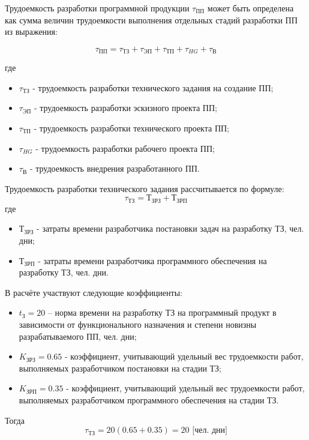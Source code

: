 Трудоемкость разработки программной продукции $\tau_{ПП}$ может быть определена как сумма величин трудоемкости выполнения отдельных стадий разработки ПП из выражения:

\begin{equation}
	\tau_{ПП} = \tau_{ТЗ} + \tau_{ЭП} + \tau_{ТП} + \tau_{HG} + \tau_{В} 
\end{equation}

где 
\begin{itemize}
  \item $\tau_{ТЗ}$ - трудоемкость разработки технического задания на создание ПП;
  \item $\tau_{ЭП}$ - трудоемкость разработки эскизного проекта ПП;
  \item $\tau_{ТП}$ - трудоемкость разработки технического проекта ПП;
  \item $\tau_{HG}$ - трудоемкость разработки рабочего проекта ПП;
  \item $\tau_{В}$ - трудоемкость внедрения разработанного ПП.
\end{itemize}

Трудоемкость разработки технического задания рассчитывается по формуле:
\begin{equation}
	\tau_{ТЗ} = Т_{ЗРЗ} + Т_{ЗРП}
\end{equation}
где 
\begin{itemize}
  \item $Т_{ЗРЗ}$ - затраты времени разработчика постановки задач на разработку ТЗ, чел. дни;
  \item $Т_{ЗРП}$ - затраты времени разработчика программного обеспечения на разработку ТЗ, чел. дни.
\end{itemize}

В расчёте участвуют следующие коэффициенты:
\begin{itemize}
  \item $t_З = 20$ – норма времени на разработку ТЗ на программный продукт в зависимости от функционального назначения и степени новизны разрабатываемого ПП, чел. дни;
  \item $K_{ЗРЗ} = 0.65$ - коэффициент, учитывающий удельный вес трудоемкости работ, выполняемых разработчиком постановки на стадии ТЗ;
  \item $K_{ЗРП} = 0.35$ - коэффициент, учитывающий удельный вес трудоемкости работ, выполняемых разработчиком программного обеспечения на стадии ТЗ.
\end{itemize}

Тогда
\begin{equation}
	\tau_{ТЗ} = 20 (0.65 + 0.35) = 20 \text{ [чел. дни]}
\end{equation}


